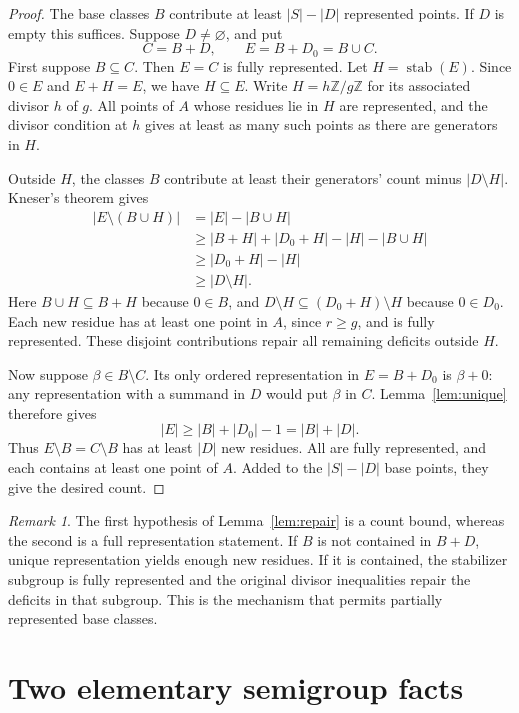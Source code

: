 \documentclass[11pt]{article}
\theoremstyle{definition}
\theoremstyle{remark}
\newtheorem{remark}[theorem]{Remark}
\newcommand{\ZZ}{\mathbb Z}
\DeclareMathOperator{\stab}{stab}
\begin{document}
\begin{proof}
The base classes $B$ contribute at least $|S|-|D|$ represented points.
If $D$ is empty this suffices. Suppose $D\ne\varnothing$, and put
\[
 C=B+D,\qquad E=B+D_0=B\cup C.
\]
First suppose $B\subseteq C$. Then $E=C$ is fully
represented. Let $H=\stab(E)$. Since $0\in E$ and $E+H=E$, we have
$H\subseteq E$. Write $H=h\ZZ/g\ZZ$ for its associated divisor
$h$ of $g$. All points of $A$ whose residues lie in $H$ are represented,
and the divisor condition at $h$ gives at least as many such points as
there are generators in $H$.

Outside $H$, the classes $B$ contribute at least their generators'
count minus $|D\setminus H|$. Kneser's theorem gives
\begin{align*}
 |E\setminus(B\cup H)|
 &=|E|-|B\cup H|\\
 &\geq |B+H|+|D_0+H|-|H|-|B\cup H|\\
 &\geq |D_0+H|-|H|\\
 &\geq |D\setminus H|.
\end{align*}
Here $B\cup H\subseteq B+H$ because $0\in B$, and
$D\setminus H\subseteq(D_0+H)\setminus H$ because $0\in D_0$.
Each new residue has at least one point in $A$, since $r\geq g$, and
is fully represented. These disjoint contributions repair all remaining
deficits outside $H$.

Now suppose $\beta\in B\setminus C$. Its only ordered
representation in $E=B+D_0$ is $\beta+0$: any representation with a
summand in $D$ would put $\beta$ in $C$. Lemma~\ref{lem:unique}
therefore gives
\[
 |E|\geq |B|+|D_0|-1=|B|+|D|.
\]
Thus $E\setminus B=C\setminus B$ has at least $|D|$ new
residues. All are fully represented, and each contains at least one
point of $A$. Added to the $|S|-|D|$ base points, they give the desired
count.
\end{proof}

\begin{remark}\label{rem:partial}
The first hypothesis of Lemma~\ref{lem:repair} is a count bound, whereas
the second is a full representation statement. If $B$ is not contained
in $B+D$, unique representation yields enough new residues. If it is
contained, the stabilizer subgroup is fully represented and the original
divisor inequalities repair the deficits in that subgroup. This is the
mechanism that permits partially represented base classes.
\end{remark}

\section{Two elementary semigroup facts}
\end{document}
